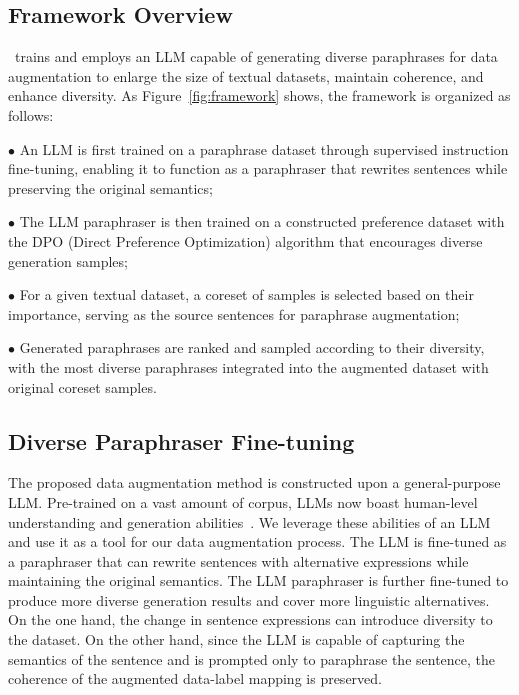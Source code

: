 \subsection{Framework Overview}

\Methodnamea~trains and employs an LLM capable of generating diverse paraphrases for data augmentation to enlarge the size of textual datasets, maintain coherence, and enhance diversity. 
As Figure~\ref{fig:framework} shows, the framework is organized as follows:
    
    \noindent$\bullet$ An LLM is first trained on a paraphrase dataset through supervised instruction fine-tuning, enabling it to function as a paraphraser that rewrites sentences while preserving the original semantics; 
    
    \noindent$\bullet$ The LLM paraphraser is then trained on a constructed preference dataset with the DPO (Direct Preference Optimization) algorithm that encourages diverse generation samples; 
    
    \noindent$\bullet$ For a given textual dataset, a coreset of samples is selected based on their importance, serving as the source sentences for paraphrase augmentation; 
    
    \noindent$\bullet$ Generated paraphrases are ranked and sampled according to their diversity, with the most diverse paraphrases integrated into the augmented dataset with original coreset samples. 

\subsection{Diverse Paraphraser Fine-tuning}

The proposed data augmentation method is constructed upon a general-purpose LLM. 
Pre-trained on a vast amount of corpus, LLMs now boast human-level understanding and generation abilities~\cite{ouyang2022training,dubey2024llama}. 
We leverage these abilities of an LLM and use it as a tool for our data augmentation process. 
The LLM is fine-tuned as a paraphraser that can rewrite sentences with alternative expressions while maintaining the original semantics. 
The LLM paraphraser is further fine-tuned to produce more diverse generation results and cover more linguistic alternatives. 
On the one hand, the change in sentence expressions can introduce diversity to the dataset. 
On the other hand, since the LLM is capable of capturing the semantics of the sentence and is prompted only to paraphrase the sentence, the coherence of the augmented data-label mapping is preserved. 

